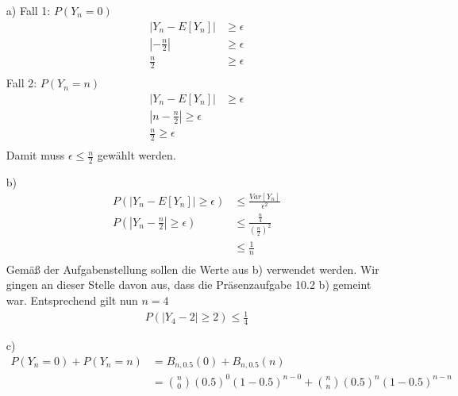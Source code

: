 \begin{enumerate}
	\item[a)] Fall 1:	$P(Y_{n} = 0)$\\
		\begin{equation*}
			\begin{split}
				|Y_n - E[Y_n]| &\ge \epsilon\\
				|- \frac{n}{2}| &\ge \epsilon\\
				\frac{n}{2} &\ge \epsilon\\
			\end{split}
		\end{equation*}
			Fall 2:	$P(Y_n = n)$
		\begin{equation*}
			\begin{split}
				|Y_n - E[Y_n]| &\ge \epsilon\\
				|n - \frac{n}{2}| \ge \epsilon\\
				\frac{n}{2} \ge \epsilon\\
			\end{split}
		\end{equation*} 
		Damit muss $\epsilon \leq \frac{n}{2}$ gewählt werden.
	\item[b)]
		\begin{equation*}
			\begin{split}
				P(|Y_n - E[Y_n]|\ge \epsilon) 		&\leq \frac{Var[Y_n]}{\epsilon^2}\\
				P(|Y_n - \frac{n}{2}|\ge \epsilon) 	&\leq \frac{\frac{n}{4}}{(\frac{n}{2})^2}\\
													&\leq \frac{1}{n}\\
			\end{split}
		\end{equation*}
		Gemäß der Aufgabenstellung sollen die Werte aus b) verwendet werden. Wir gingen an dieser Stelle davon aus, dass die Präsenzaufgabe 10.2 b) gemeint war. Entsprechend gilt nun $n = 4$
		\begin{equation*}
			\begin{split}
				P(|Y_4 - 2|\ge 2) \leq \frac{1}{4}
			\end{split}
		\end{equation*}
	\item[c)]
		\begin{equation*}
			\begin{split}
				P(Y_n = 0) + P(Y_n = n)		&= B_{n, 0.5}(0) + B_{n, 0.5}(n)\\
											&= {n \choose 0} (0.5)^0 (1-0.5)^{n-0} + {n \choose n} (0.5)^n (1-0.5)^{n-n}\\

\end{split}
\end{equation*}
\end{enumerate}

